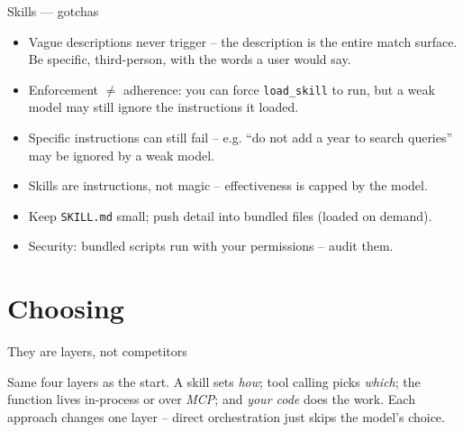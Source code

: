 \documentclass[aspectratio=169,10pt]{beamer}
\begin{document}
\begin{frame}{Skills --- gotchas}
  \begin{itemize}
    \item \alert{Vague descriptions never trigger} -- the description is the entire match surface. Be specific, third-person, with the words a user would say.
    \item \alert{Enforcement $\neq$ adherence:} you can force \texttt{load\_skill} to run, but a weak model may still ignore the instructions it loaded.
    \item \alert{Specific instructions can still fail} -- e.g. ``do not add a year to search queries'' may be ignored by a weak model.
    \item \alert{Skills are instructions, not magic} -- effectiveness is capped by the model.
    \item Keep \texttt{SKILL.md} small; push detail into bundled files (loaded on demand).
    \item \alert{Security:} bundled scripts run with your permissions -- audit them.
  \end{itemize}
\end{frame}

\section{Choosing}

\begin{frame}[fragile]{They are layers, not competitors}
  \begin{center}
  \end{center}
  \footnotesize \alert{Same four layers as the start.} A skill sets \emph{how}; tool calling picks \emph{which};
  the function lives in-process or over \emph{MCP}; and \emph{your code} does the work. Each approach changes
  \alert{one layer} -- direct orchestration just skips the model's choice.
\end{frame}
\end{document}
